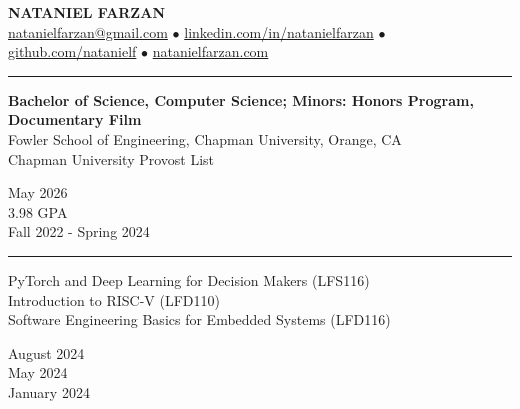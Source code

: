 \documentclass[letter]{article}
\begin{document}
    \begin{center}
        {\huge \textbf{\uppercase{Nataniel Farzan}}} \\
        \href{mailto:natanielfarzan@gmail.com}{natanielfarzan@gmail.com} $\bullet$
        \href{https://www.linkedin.com/in/natanielfarzan}{linkedin.com/in/natanielfarzan} $\bullet$
        \href{https://github.com/natanielf}{github.com/natanielf} $\bullet$
        \href{https://natanielfarzan.com/}{natanielfarzan.com}
    \end{center}

    \vspace{4pt}
    \hrule height 1pt
    \vspace{4pt}
    \noindent
    \begin{minipage}[c]{0.79\linewidth}
        \noindent \textbf{Bachelor of Science, Computer Science; Minors: Honors Program, Documentary Film} \\
        \noindent Fowler School of Engineering, Chapman University, Orange, CA \\
        \noindent Chapman University Provost List \\
    \end{minipage}
    \begin{minipage}[c]{0.20\linewidth}
        \vspace*{-\baselineskip}
        \begin{flushright}
            May 2026 \\
            3.98 GPA \\
            Fall 2022 - Spring 2024 \\
        \end{flushright}
    \end{minipage}

    \vspace{4pt}
    \hrule height 1pt
    \vspace{4pt}
    \noindent
    \begin{minipage}[c]{0.7\linewidth}
        \noindent PyTorch and Deep Learning for Decision Makers (LFS116) \\
        \noindent Introduction to RISC-V (LFD110) \\
        \noindent Software Engineering Basics for Embedded Systems (LFD116) \\
    \end{minipage}
    \begin{minipage}[c]{0.29\linewidth}
        \vspace*{-\baselineskip}
        \begin{flushright}
            August 2024 \\
            May 2024 \\
            January 2024 \\
        \end{flushright}
    \end{minipage}
\end{document}
